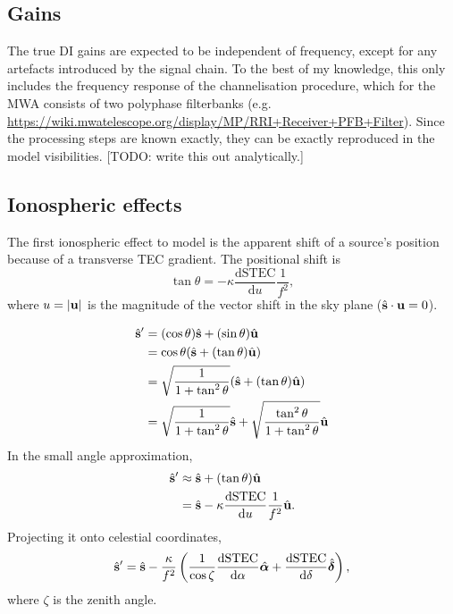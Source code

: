\documentclass{book}
\newcommand{\deriv}[2]{\frac{\text{d}{#1}}{\text{d}{#2}}}
\newcommand{\shat}{\hat{\bf s}}
\begin{document}
\subsection{Gains}

The true DI gains are expected to be independent of frequency, except for any artefacts introduced by the signal chain.
To the best of my knowledge, this only includes the frequency response of the channelisation procedure, which for the MWA consists of two polyphase filterbanks (e.g. \url{https://wiki.mwatelescope.org/display/MP/RRI+Receiver+PFB+Filter}).
Since the processing steps are known exactly, they can be exactly reproduced in the model visibilities.
[TODO: write this out analytically.]

\subsection{Ionospheric effects}

The first ionospheric effect to model is the apparent shift of a source's position because of a transverse TEC gradient.
The positional shift is
\begin{equation}
    \tan\theta = -\kappa\deriv{\text{STEC}}{u} \frac{1}{f^2},
\end{equation}
where $u = |{\bf u}|$ is the magnitude of the vector shift in the sky plane ($\shat\cdot{\bf u} = 0$).

\begin{equation}
    \begin{aligned}
        \shat^\prime
            &= (\cos\theta) \shat + (\sin\theta) \hat{\bf u} \\
            &= \cos\theta(\shat + (\tan\theta) \hat{\bf u}) \\
            &= \sqrt{\frac{1}{1 + \tan^2\theta}} (\shat + (\tan\theta) \hat{\bf u}) \\
            &= \sqrt{\frac{1}{1 + \tan^2\theta}} \shat + \sqrt{\frac{\tan^2\theta}{1 + \tan^2\theta}} \hat{\bf u}
    \end{aligned}
\end{equation}
In the small angle approximation,
\begin{equation}
    \begin{aligned}
        \shat^\prime
            &\approx \shat + (\tan\theta) \hat{\bf u} \\
            &= \shat - \kappa\deriv{\text{STEC}}{u} \frac{1}{f^2} \hat{\bf u}.
    \end{aligned}
\end{equation}
Projecting it onto celestial coordinates,
\begin{equation}
    \shat^\prime = \shat - \frac{\kappa}{f^2} \left( \frac{1}{\cos\zeta} \deriv{\text{STEC}}{\alpha}\hat{\bm{\alpha}} + \deriv{\text{STEC}}{\delta}\hat{\bm{\delta}} \right),
\end{equation}
where $\zeta$ is the zenith angle.
\end{document}
